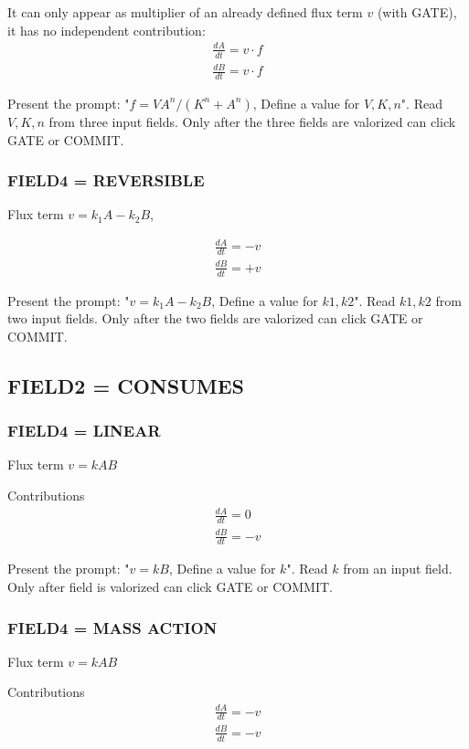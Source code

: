 \documentclass[11pt, oneside]{article}
\begin{document}
It can only appear as multiplier of an already defined flux term $v$ (with GATE), it has no independent contribution:
\begin{align}
\frac{dA}{dt} = v \cdot f \\
\frac{dB}{dt} = v \cdot f
\end{align}

Present the prompt: "$f = V A^n/(K^n+A^n)$, Define a value for $V,K,n$". Read $V,K,n$ from three input fields.
Only after the three fields are valorized can click GATE or COMMIT.


\subsubsection{FIELD4 = REVERSIBLE}

Flux term $v = k_1 A - k_2 B$,

\begin{align}
\frac{dA}{dt} = -v \\
\frac{dB}{dt} = +v
\end{align}

Present the prompt: "$v = k_1 A - k_2 B$, Define a value for $k1,k2$". Read $k1,k2$ from two input fields.
Only after the two fields are valorized can click GATE or COMMIT.

\subsection{FIELD2 = CONSUMES}

\subsubsection{FIELD4 = LINEAR}

Flux term $v = kAB$ 

Contributions
\begin{align}
\frac{dA}{dt} = 0 \\
\frac{dB}{dt} = -v 
\end{align}

Present the prompt: "$v = kB$, Define a value for $k$". Read $k$ from an input field.
Only after field is valorized can click GATE or COMMIT.

\subsubsection{FIELD4 = MASS ACTION}

Flux term $v = kAB$ 

Contributions
\begin{align}
\frac{dA}{dt} = -v \\
\frac{dB}{dt} = -v 
\end{align}
\end{document}
